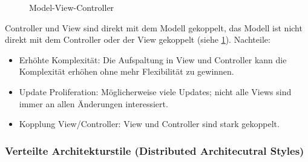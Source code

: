 \documentclass[
    ngerman,
    color=3b,
    summary,
    boxarc,
    main,
]{rubos-tuda-template}
\begin{document}
\begin{figure}[ht]
    \centering
    \caption{Model-View-Controller}
    \label{fig:mvc}
\end{figure}
Controller und View sind direkt mit dem Modell gekoppelt, das Modell ist nicht direkt mit dem Controller oder der View gekoppelt (siehe \ref{fig:mvc}).
\clearpage
Nachteile:
\begin{itemize}
    \item Erhöhte Komplexität: Die Aufspaltung in View und Controller kann die Komplexität erhöhen ohne mehr Flexibilität zu gewinnen.
    \item Update Proliferation: Möglicherweise viele Updates; nicht alle Views sind immer an allen Änderungen interessiert.
    \item Kopplung View/Controller: View und Controller sind stark gekoppelt.
\end{itemize}
\subsubsection{Verteilte Architekturstile (Distributed Architecutral Styles)}
\end{document}
